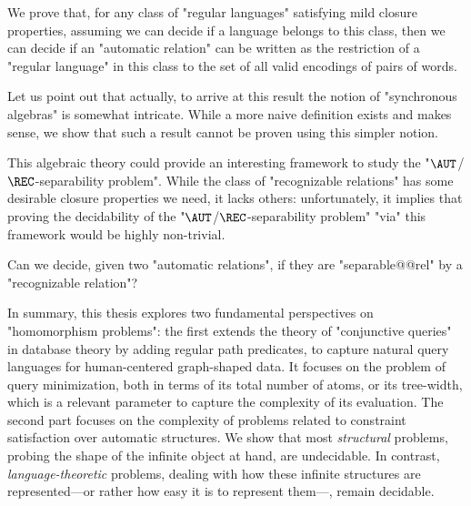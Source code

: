 \begin{contribution}
	We prove that, for any class of "regular languages" satisfying mild closure
	properties, assuming we can decide if a language belongs to this class,
	then we can decide if an "automatic relation" can be written as the restriction
	of a "regular language" in this class to the set of all valid encodings
	of pairs of words.
\end{contribution}

Let us point out that actually, to arrive at this result the notion
of "synchronous algebras" is somewhat intricate. While a more naive definition
exists and makes sense, we show that such a result cannot be proven using this
simpler notion.

This algebraic theory could provide an interesting framework to
study the "$\AUT$/$\REC$-separability problem".
While the class of "recognizable relations" has some desirable
closure properties we need, it lacks others:
unfortunately, it implies that proving the decidability of
the "$\AUT$/$\REC$-separability problem" "via" this framework would
be highly non-trivial.

\begin{openproblemintro}
	Can we decide, given two "automatic relations", if they are "separable@@rel"
	by a "recognizable relation"?
\end{openproblemintro}

In summary, this thesis explores two fundamental perspectives on "homomorphism problems":
the first extends the theory of "conjunctive queries" in database theory by adding regular path
predicates, to capture natural query languages for human-centered graph-shaped data.
It focuses on the problem of query minimization, both in terms of
its total number of atoms, or its tree-width, which is a relevant parameter to
capture the complexity of its evaluation.
The second part focuses on the complexity of problems related to constraint satisfaction
over automatic structures. We show that most \emph{structural} problems, probing the shape of the 
infinite object at hand, are undecidable. In contrast, \emph{language-theoretic} 
problems, dealing with how these infinite structures are represented---or rather how easy it
is to represent them---, remain decidable.